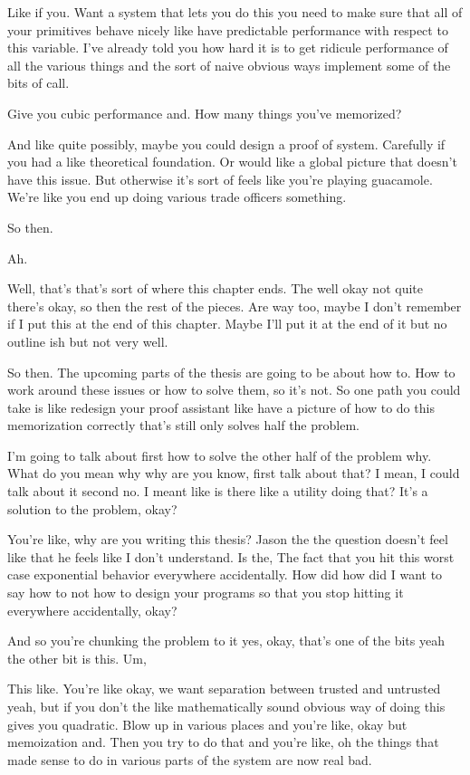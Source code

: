 \begin{subappendices}
    Like if you. Want a system that lets you do this you need to make sure that all of your primitives behave nicely like have predictable performance with respect to this variable. I've already told you how hard it is to get ridicule performance of all the various things and the sort of naive obvious ways implement some of the bits of call. 
    
    Give you cubic performance and. How many things you've memorized? 
    
    And like quite possibly, maybe you could design a proof of system. Carefully if you had a like theoretical foundation. Or would like a global picture that doesn't have this issue. But otherwise it's sort of feels like you're playing guacamole. We're like you end up doing various trade officers something. 
    
    So then. 
    
    Ah. 
    
    Well, that's that's sort of where this chapter ends. The well okay not quite there's okay, so then the rest of the pieces. Are way too, maybe I don't remember if I put this at the end of this chapter. Maybe I'll put it at the end of it but no outline ish but not very well. 
    
    So then. The upcoming parts of the thesis are going to be about how to. How to work around these issues or how to solve them, so it's not. So one path you could take is like redesign your proof assistant like have a picture of how to do this memorization correctly that's still only solves half the problem. 
    
    I'm going to talk about first how to solve the other half of the problem why. What do you mean why why are you know, first talk about that? I mean, I could talk about it second no. I meant like is there like a utility doing that? It's a solution to the problem, okay? 
    
    You're like, why are you writing this thesis? Jason the the question doesn't feel like that he feels like I don't understand. Is the, The fact that you hit this worst case exponential behavior everywhere accidentally. How did how did I want to say how to not how to design your programs so that you stop hitting it everywhere accidentally, okay? 
    
    And so you're chunking the problem to it yes, okay, that's one of the bits yeah the other bit is this. Um, 
    
    This like. You're like okay, we want separation between trusted and untrusted yeah, but if you don't the like mathematically sound obvious way of doing this gives you quadratic. Blow up in various places and you're like, okay but memoization and. Then you try to do that and you're like, oh the things that made sense to do in various parts of the system are now real bad. 
    

\end{subappendices}
